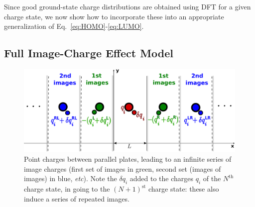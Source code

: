 \documentclass[aip,jcp,a4paper,reprint,floatfix,superscriptaddress]{revtex4-1}
\begin{document}
Since good ground-state charge distributions are obtained using DFT for a given charge state, we now show how to incorporate these into an appropriate generalization of Eq.~\eqref{eq:HOMO}-\eqref{eq:LUMO}.

\subsection{Full Image-Charge Effect Model}\label{full_model}

\begin{figure}
\includegraphics[width=\columnwidth]{img.exp/Illustration/mirrorplanes}
\caption{Point charges between parallel plates, leading to an infinite series of image charges (first set of images in green, second set (images of images) in blue, \emph{etc}). Note the $\delta q_i$ added to the charges $q_i$ of the $N^\text{th}$ charge state, in going to the $(N+1)^\text{st}$ charge state: these also induce a series of repeated images.}\label{fg:imagemodel}
\end{figure}
\end{document}
